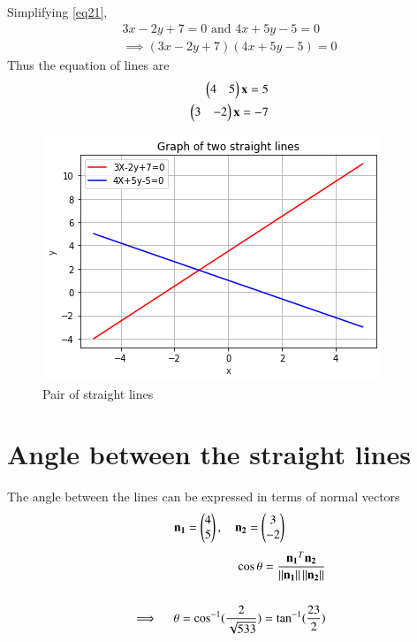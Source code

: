 \documentclass[journal,12pt,twocolumn]{IEEEtran}
\begin{document}
Simplifying \eqref{eq21},
\begin{align}
	\label{eq22}3x -2y + 7 = 0 \text{ and } 4x + 5y -5 = 0\\
	\implies (3x - 2y + 7)(4x + 5y - 5) = 0
\end{align}
Thus the equation of lines are
\begin{align}
	\begin{pmatrix}4 & 5\end{pmatrix}\mathbf{x} = 5 \\
	\begin{pmatrix}3 & -2\end{pmatrix}\mathbf{x} = -7 
\end{align}
\begin{figure}[h]
    \centering
    \includegraphics[width=\columnwidth]{Figure.png}
    \caption{Pair of straight lines}
    \label{Fig :1}
\end{figure}
\section{Angle between the straight lines}
The angle between the lines can be expressed in terms of normal vectors 
\begin{align}
	\mathbf{n_1}=\begin{pmatrix}4\\5\end{pmatrix} , \quad \mathbf{n_2}=\begin{pmatrix}3\\-2\end{pmatrix}
\end{align}
\begin{align}
	\cos\theta=\frac{\mathbf{n_1}^T\mathbf{n_2}}{\left\lVert\mathbf{n_1}\right\rVert\left\lVert\mathbf{n_2}\right\rVert} \\
				\nonumber \\
	\implies \quad \theta=\cos^{-1}({\frac{2}{\sqrt{533}}}) = \tan^{-1}(\frac{23}{2})
\end{align}
\end{document}
